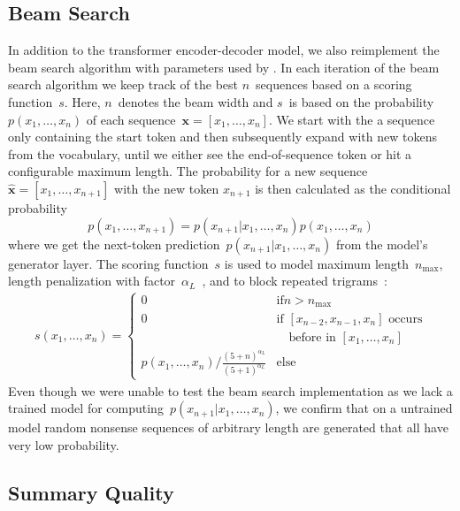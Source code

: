 \subsection{Beam Search}

In addition to the transformer encoder-decoder model, we also reimplement the beam search algorithm with parameters used by \citeauthor{LiuL2019}.
In each iteration of the beam search algorithm we keep track of the best \(n\)~sequences based on a scoring function~\(s\).
Here, \(n\)~denotes the beam width and \(s\)~is based on the probability~\(p(x_1,\ldots,x_n)\) of each sequence~\(\mathbf{x} = [x_1,\ldots,x_n]\).
We start with the a sequence only containing the start token and then subsequently expand with new tokens from the vocabulary, until we either see the end-of-sequence token or hit a configurable maximum length.
The probability for a new sequence \(\mathbf{\hat x} = [x_1,\ldots,x_{n+1}]\) with the new token \(x_{n+1}\) is then calculated as the conditional probability
\[ p(x_1,\ldots,x_{n+1}) = p(x_{n+1}|x_1,\ldots,x_n)p(x_1,\ldots,x_n) \]
where we get the next-token prediction~\( p(x_{n+1}|x_1,\ldots,x_n) \) from the model's generator layer.
The scoring function~\(s\) is used to model maximum length~\(n_\text{max}\), length penalization with factor~\(\alpha_L\)~\cite{WuSCLNMKCGMKSJL2016}, and to block repeated trigrams~\cite{PaulusXS2018}:
\begin{align*}
    s(x_1,\ldots,x_n) = \begin{cases}
        0 & \text{if} n > n_\text{max} \\
        0 & \text{if \([x_{n-2},x_{n-1},x_n]\) occurs} \\
        & \quad\text{before in  \([x_1,\ldots,x_n]\)} \\
        p(x_1,\ldots,x_n) / \frac{(5 + n)^{\alpha_L}}{(5 + 1)^{\alpha_L}} & \text{else}
    \end{cases}
\end{align*}
Even though we were unable to test the beam search implementation as we lack a trained model for computing~\( p(x_{n+1}|x_1,\ldots,x_n) \), we confirm that on a untrained model random nonsense sequences of arbitrary length are generated that all have very low probability.

\subsection{Summary Quality}

